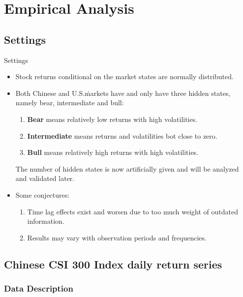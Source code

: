 
\section{\large Empirical Analysis}


\subsection{Settings}

\begin{frame}[fragile,t]{Settings}
	\begin{itemize}\vspace{0.4mm}
	\item Stock returns conditional on the market states are normally distributed.
	\item Both Chinese and U.S.\.markets have and only have three hidden states,
        namely bear, intermediate and bull:
        \begin{enumerate}
        \item \textbf{Bear} means relatively low returns with high volatilities.
        \item \textbf{Intermediate} means returns and volatilities bot close to zero.
        \item \textbf{Bull} means relatively high returns with high volatilities.
        \end{enumerate}
        The number of hidden states is now artificially given and 
        will be analyzed and validated later.
    \item Some conjectures:
    	\begin{enumerate}
        \item Time lag effects exist and worsen due to too much weight of outdated information.
        \item Results may vary with observation periods and frequencies.
        \end{enumerate}
	\end{itemize}
\end{frame}


\subsection{Chinese CSI 300 Index daily return series}

\subsubsection{Data Description}

